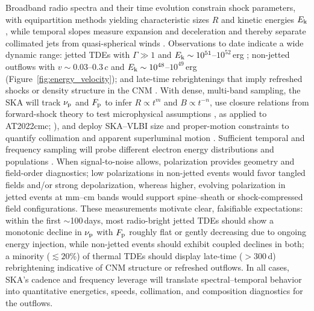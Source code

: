 \documentclass[a4paper,11pt]{article}
\begin{document}
Broadband radio spectra and their time evolution constrain shock parameters, with equipartition methods yielding characteristic sizes $R$ and kinetic energies $E_{\rm k}$, while temporal slopes measure expansion and deceleration and thereby separate collimated jets from quasi-spherical winds \citep[e.g.,][]{Chevalier1998,BarniolDuran2013}. Observations to date indicate a wide dynamic range: jetted TDEs with $\Gamma\gg 1$ and $E_{\rm k}\sim 10^{51}$--$10^{52}\,$erg \citep{Zauderer2011,Berger2012,Mimica2015,YaoY2023, Rhodes2023}; non-jetted outflows with $v\sim 0.03$--$0.3\,c$ and $E_{\rm k}\sim 10^{48}$--$10^{49}\,$erg \citep[e.g.][]{Alexander2016,Bright2018} (Figure~\ref{fig:energy_velocity}); and late-time rebrightenings that imply refreshed shocks or density structure in the CNM \citep{Cendes2022,Goodwin2022,Cendes2024,Goodwin2025}. With dense, multi-band sampling, the SKA will track $\nu_{\rm p}$ and $F_{\rm p}$ to infer $R \propto t^{m}$ and $B \propto t^{-n}$, use closure relations from forward-shock theory to test microphysical assumptions \citep[analogous to Gamma Ray Burst afterglows;][]{Sari1998,Granot2002}, as applied to AT2022cmc; \citep{Yao2024}), and deploy SKA--VLBI size and proper-motion constraints to quantify collimation and apparent superluminal motion \citep{Yang2016}. Sufficient temporal and frequency sampling will probe different electron energy distributions and populations \citep{Rhodes2025}. When signal-to-noise allows, polarization provides geometry and field-order diagnostics; low polarizations in non-jetted events would favor tangled fields and/or strong depolarization, whereas higher, evolving polarization in jetted events at mm--cm bands would support spine--sheath or shock-compressed field configurations. These measurements motivate clear, falsifiable expectations: within the first $\sim$100\,days, most radio-bright jetted TDEs should show a monotonic decline in $\nu_{\rm p}$ with $F_{\rm p}$ roughly flat or gently decreasing due to ongoing energy injection, while non-jetted events should exhibit coupled declines in both; a minority ($\lesssim 20\%$) of thermal TDEs should display late-time ($>300$\,d) rebrightening indicative of CNM structure or refreshed outflows. In all cases, SKA's cadence and frequency leverage will translate spectral--temporal behavior into quantitative energetics, speeds, collimation, and composition diagnostics for the outflows.
\end{document}
